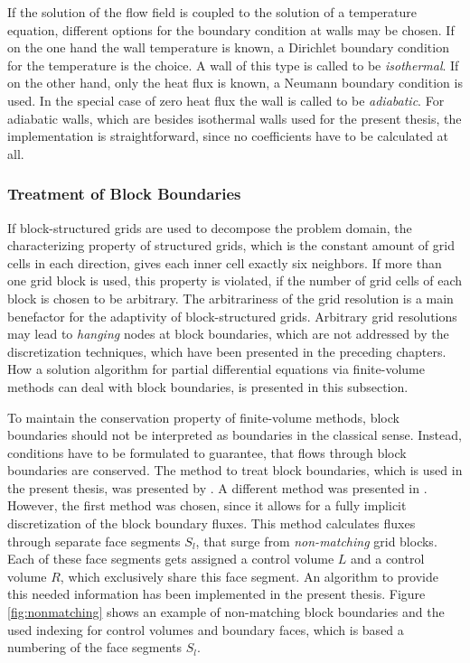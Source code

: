 If the solution of the flow field is coupled to the solution of a temperature equation, different options for the boundary condition at walls may be chosen. If on the one hand the wall temperature is known, a Dirichlet boundary condition for the temperature is the choice. A wall of this type is called to be \emph{isothermal}. If on the other hand, only the heat flux is known, a Neumann boundary condition is used. In the special case of zero heat flux the wall is called to be \emph{adiabatic}. For adiabatic walls, which are besides isothermal walls used for the present thesis, the implementation is straightforward, since no coefficients have to be calculated at all.

\subsubsection{Treatment of Block Boundaries}
\label{sec:blockboundaries}

If block-structured grids are used to decompose the problem domain, the characterizing property of structured grids, which is the constant amount of grid cells in each direction, gives each inner cell exactly six neighbors. If more than one grid block is used, this property is violated, if the number of grid cells of each block is chosen to be arbitrary. The arbitrariness of the grid resolution is a main benefactor for the adaptivity of block-structured grids. Arbitrary grid resolutions may lead to \emph{hanging} nodes at block boundaries, which are not addressed by the discretization techniques, which have been presented in the preceding chapters. How a solution algorithm for partial differential equations via finite-volume methods can deal with block boundaries, is presented in this subsection.

To maintain the conservation property \cite{schaefer99} of finite-volume methods, block boundaries should not be interpreted as boundaries in the classical sense. Instead, conditions have to be formulated to guarantee, that flows through block boundaries are conserved. The method to treat block boundaries, which is used in the present thesis, was presented by \cite{lilek97}. A different method was presented in \cite{lange02}. However, the first method was chosen, since it allows for a fully implicit discretization of the block boundary fluxes. This method calculates fluxes through separate face segments \(S_l\), that surge from \emph{non-matching} grid blocks. Each of these face segments gets assigned a control volume \(L\) and a control volume \(R\), which exclusively share this face segment. An algorithm to provide this needed information has been implemented in the present thesis. Figure \ref{fig:nonmatching} shows an example of non-matching block boundaries and the used indexing for control volumes and boundary faces, which is based a numbering of the face segments \(S_l\).

